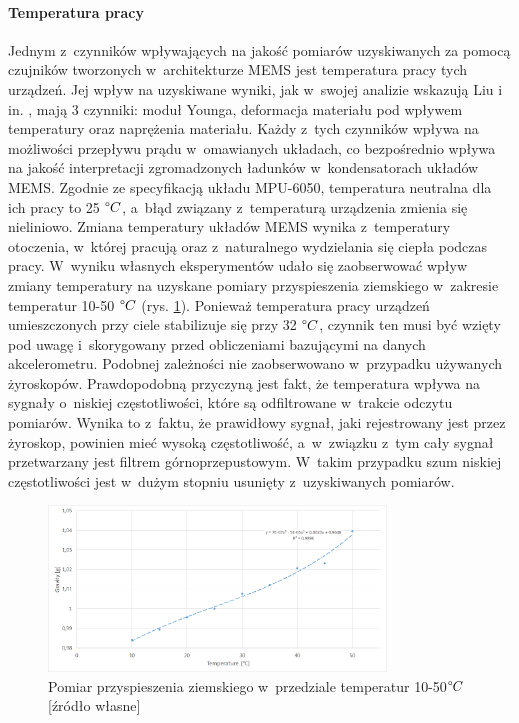 \paragraph*{Temperatura pracy}
Jednym z~czynników wpływających na jakość pomiarów uzyskiwanych za pomocą czujników tworzonych w~architekturze MEMS jest temperatura pracy tych urządzeń.
Jej wpływ na uzyskiwane wyniki, jak w~swojej analizie wskazują Liu i in. \cite{Liu2007, Liu2015}, mają 3 czynniki: moduł Younga, deformacja materiału pod wpływem temperatury oraz naprężenia materiału. Każdy z~tych czynników wpływa na możliwości przepływu prądu w~omawianych układach, co bezpośrednio wpływa na jakość interpretacji zgromadzonych ładunków w~kondensatorach układów MEMS. Zgodnie ze specyfikacją układu MPU-6050, temperatura neutralna dla ich pracy to 25 $\degree C$, a~błąd związany z~temperaturą urządzenia zmienia się nieliniowo. Zmiana temperatury układów MEMS wynika z~temperatury otoczenia, w~której pracują oraz z~naturalnego wydzielania się ciepła podczas pracy. W~wyniku własnych eksperymentów udało się zaobserwować wpływ zmiany temperatury na uzyskane pomiary przyspieszenia ziemskiego w~zakresie temperatur 10-50 $\degree C$ (rys. \ref{fig:characteristics:imu:temp}). Ponieważ temperatura pracy urządzeń umieszczonych przy ciele stabilizuje się przy 32 $\degree C$, czynnik ten musi być wzięty pod uwagę i~skorygowany przed obliczeniami bazującymi na danych akcelerometru. Podobnej zależności nie zaobserwowano w~przypadku używanych żyroskopów. Prawdopodobną przyczyną jest fakt, że temperatura wpływa na sygnały o~niskiej częstotliwości, które są odfiltrowane w~trakcie odczytu pomiarów. Wynika to z~faktu, że prawidłowy sygnał, jaki rejestrowany jest przez żyroskop, powinien mieć wysoką częstotliwość, a~w~związku z~tym cały sygnał przetwarzany jest filtrem górnoprzepustowym. W~takim przypadku szum niskiej częstotliwości jest w~dużym stopniu usunięty z~uzyskiwanych pomiarów.
		
\begin{figure}
	\centering
	\includegraphics[width=0.8\textwidth]{images/temp.png}
	\caption{Pomiar przyspieszenia ziemskiego w~przedziale temperatur 10-50$\degree C$ [źródło własne]}
	\label{fig:characteristics:imu:temp}
\end{figure}
		
